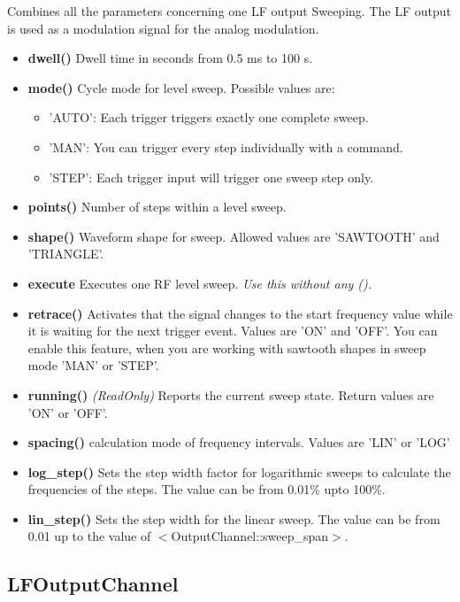 \documentclass[11pt]{article} %
\begin{document}
Combines all the parameters concerning one LF output Sweeping. The LF output is used as a modulation signal for the analog modulation.
\begin{itemize}
\item {\bf dwell()} Dwell time in seconds from 0.5 ms to 100 s.
\item {\bf mode()} Cycle mode for level sweep. Possible values are:
	\begin{itemize}[]
	\item 'AUTO': Each trigger triggers exactly one complete sweep.
	\item 'MAN':  You can trigger every step individually with a command.
	\item 'STEP': Each trigger input will trigger one sweep step only.
	\end{itemize}
\item {\bf points()} Number of steps within a level sweep.
\item {\bf shape()} Waveform shape for sweep. Allowed values are 'SAWTOOTH' and 'TRIANGLE'.
\item {\bf execute} Executes one RF level sweep. {\it Use this without any ().}
\item {\bf retrace()} Activates that the signal changes to the start frequency value while it is waiting for the
next trigger event.  Values are 'ON' and 'OFF'. You can enable this feature, when you are working with sawtooth shapes in sweep mode 'MAN' or 'STEP'.
\item {\bf running()} {\it (ReadOnly)} Reports the current sweep state. Return values are 'ON' or 'OFF'.
\item {\bf spacing()} calculation mode of frequency intervals. Values are 'LIN' or 'LOG'
\item {\bf log\_step()} Sets the step width factor for logarithmic sweeps to calculate the frequencies of the
steps. The value can be from 0.01\% upto 100\%.
\item {\bf lin\_step()} Sets the step width for the linear sweep. The value can be from 0.01 up to the value of $<$OutputChannel::sweep\_span$>$.
\end{itemize}


\subsection{LFOutputChannel}
\end{document}

